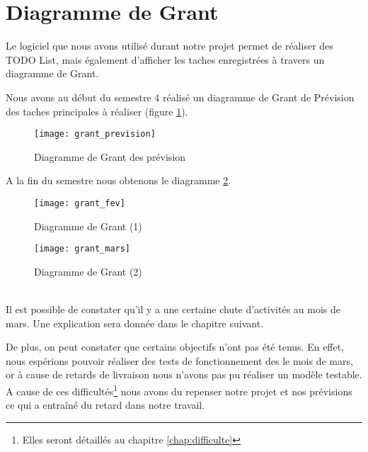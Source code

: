 \section{Diagramme de Grant}

Le logiciel que nous avons utilisé durant notre projet permet de réaliser des TODO List, mais également d'afficher les taches enregistrées à travers un diagramme de Grant.

Nous avons au début du semestre 4 réalisé un diagramme de Grant de Prévision des taches principales à réaliser (figure \ref{fig:grant_pre}).

\begin{figure}[h]
  \centering
  \texttt{[image: grant\_prevision]}
  \caption{Diagramme de Grant des prévision}
  \label{fig:grant_pre}
\end{figure}


A la fin du semestre nous obtenons le diagramme  \ref{fig:grant_fev}.
\begin{figure}[h]
  \centering
  \texttt{[image: grant\_fev]}
  \caption{Diagramme de Grant (1)}
  \label{fig:grant_fev}
\end{figure}
\begin{figure}[h]
  \centering
  \texttt{[image: grant\_mars]}
  \caption{Diagramme de Grant (2)}
  \label{fig:grant_mars}
\end{figure}

~\\
Il est possible de constater qu'il y a une certaine chute d'activités au mois de mars. Une explication sera donnée dans le chapitre suivant.

De plus, on peut constater que certains objectifs n'ont pas été tenus. En effet, nous espérions pouvoir réaliser des tests de fonctionnement des le mois de mars, or à cause de retards de livraison nous n'avons pas pu réaliser un modèle testable. A cause de ces difficultés\footnote{Elles seront détaillés au chapitre \ref{chap:difficulte}} nous avons du repenser notre projet et nos prévisions ce qui a entraîné du retard dans notre travail.


